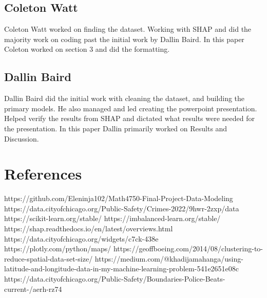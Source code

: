 \documentclass[conference]{IEEEtran}
\begin{document}
\subsection{Coleton Watt}
Coleton Watt worked on finding the dataset. Working with SHAP and did the majority work on coding past the initial work by Dallin Baird. In this paper Coleton worked on section 3 and did the formatting. 
\subsection{Dallin Baird}
Dallin Baird did the initial work with cleaning the dataset, and building the primary models. He also managed and led creating the powerpoint presentation. Helped verify the results from SHAP and dictated what results were needed for the presentation. In this paper Dallin primarily worked on Results and Discussion.

\section*{References}

\begin{thebibliography}{00}
 https://github.com/Eleninja102/Math4750-Final-Project-Data-Modeling
 https://data.cityofchicago.org/Public-Safety/Crimes-2022/9hwr-2zxp/data 
 https://scikit-learn.org/stable/
 https://imbalanced-learn.org/stable/
 https://shap.readthedocs.io/en/latest/overviews.html
 https://data.cityofchicago.org/widgets/c7ck-438e 
 https://plotly.com/python/maps/ 
 https://geoffboeing.com/2014/08/clustering-to-reduce-spatial-data-set-size/ 
 https://medium.com/@khadijamahanga/using-latitude-and-longitude-data-in-my-machine-learning-problem-541e2651e08c
 https://data.cityofchicago.org/Public-Safety/Boundaries-Police-Beats-current-/aerh-rz74
\end{thebibliography}
\end{document}

